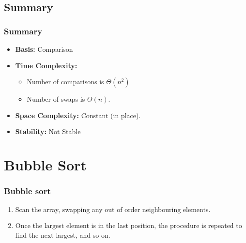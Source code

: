 \documentclass{beamer}
\begin{document}
\subsection{Summary}
\begin{frame}
\frametitle{Summary}
\begin{itemize}
\item \textbf{Basis:} Comparison
\item \textbf{Time Complexity:}
\begin{itemize}
\item Number of comparisons is $\Theta(n^2)$
\item Number of swaps is $\Theta(n)$.
\end{itemize}
\item \textbf{Space Complexity:} Constant (in place).
\item \textbf{Stability:} Not Stable
\end{itemize}
\end{frame}
\section{Bubble Sort}
\begin{frame}
\frametitle{Bubble sort}
\begin{enumerate}
\item Scan the array, swapping any out of order neighbouring elements.
\item Once the largest element is in the last position, the procedure is repeated to find the next largest, and so on.
\bub
\end{enumerate}
\end{frame}
\end{document}
